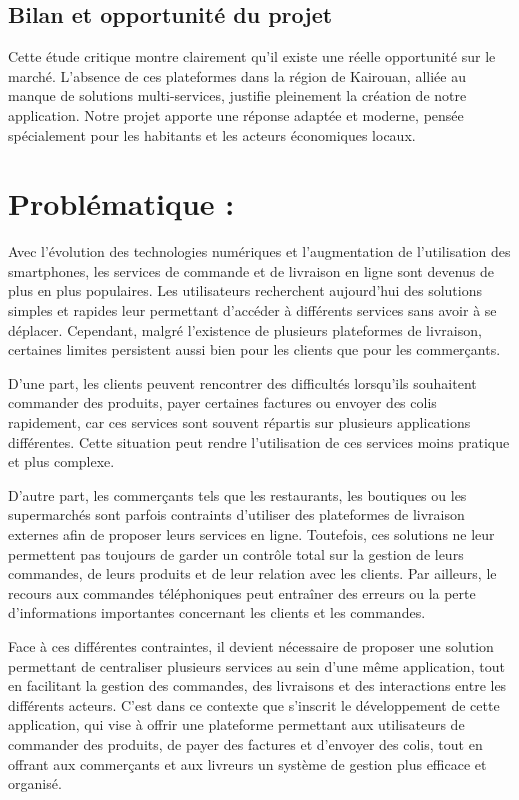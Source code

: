 \documentclass[12pt,fleqn,a4paper]{report}
\begin{document}
\begin{justify}
\subsection{Bilan et opportunité du projet}

Cette étude critique montre clairement qu'il existe une réelle opportunité sur le marché. L'absence de ces plateformes dans la région de Kairouan, alliée au manque de solutions multi-services, justifie pleinement la création de notre application. Notre projet apporte une réponse adaptée et moderne, pensée spécialement pour les habitants et les acteurs économiques locaux.

\section{Problématique :}
Avec l'évolution des technologies numériques et l'augmentation de l'utilisation des smartphones, les services de commande et de livraison en ligne sont devenus de plus en plus populaires. Les utilisateurs recherchent aujourd'hui des solutions simples et rapides leur permettant d'accéder à différents services sans avoir à se déplacer. Cependant, malgré l'existence de plusieurs plateformes de livraison, certaines limites persistent aussi bien pour les clients que pour les commerçants.

D'une part, les clients peuvent rencontrer des difficultés lorsqu'ils souhaitent commander des produits, payer certaines factures ou envoyer des colis rapidement, car ces services sont souvent répartis sur plusieurs applications différentes. Cette situation peut rendre l'utilisation de ces services moins pratique et plus complexe.

D'autre part, les commerçants tels que les restaurants, les boutiques ou les supermarchés sont parfois contraints d'utiliser des plateformes de livraison externes afin de proposer leurs services en ligne. Toutefois, ces solutions ne leur permettent pas toujours de garder un contrôle total sur la gestion de leurs commandes, de leurs produits et de leur relation avec les clients. Par ailleurs, le recours aux commandes téléphoniques peut entraîner des erreurs ou la perte d'informations importantes concernant les clients et les commandes.

Face à ces différentes contraintes, il devient nécessaire de proposer une solution permettant de centraliser plusieurs services au sein d'une même application, tout en facilitant la gestion des commandes, des livraisons et des interactions entre les différents acteurs. C'est dans ce contexte que s'inscrit le développement de cette application, qui vise à offrir une plateforme permettant aux utilisateurs de commander des produits, de payer des factures et d'envoyer des colis, tout en offrant aux commerçants et aux livreurs un système de gestion plus efficace et organisé.


\end{justify}
\end{document}
